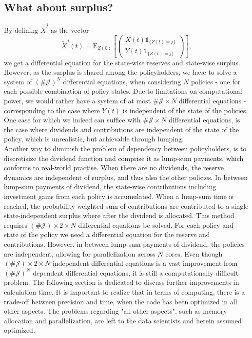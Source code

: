 \documentclass[12pt]{article}
\newcommand{\E}{\text{E}}
\newcommand{\indic}[1]{\mathds{1}_{ \{ #1 \} }}
\begin{document}
\subsection*{What about surplus?}
By defining $\tilde{X}^j$ as the vector
$$
\tilde{X}^j(t)=\E_{Z(0)}
\left[ 
\begin{pmatrix}
X(t)\indic{Z(t)=j}
\\
Y(t)\indic{Z(t)=j}
\end{pmatrix}
\right],
$$
we get a differential equation for the state-wise reserves and state-wise surplus. However, as the surplus is shared among the policyholders, we have to solve a system of $(\#\mathcal{J})^{N}$ differential equations, when considering $N$ policies - one for each possible combination of policy states. Due to limitations on computational power, we would rather have a system of at most $\# \mathcal{J} \times N$ differential equations - corresponding to the case where $Y(t)$ is independent of the state of the policies. One case for which we indeed can suffice with $\# \mathcal{J} \times N$ differential equations, is the case where dividends and contributions are independent of the state of the policy, which is unrealistic, but achievable through lumping.\\
Another way to diminish the problem of dependency between policyholders, is to discretisize the dividend function and comprise it as lump-sum payments, which conforms to real-world practise. When there are no dividends, the reserve dynamics are independent of surplus, and thus also the other policies. In between lump-sum payments of dividend, the state-wise contributions including investment gains from each policy is accumulated. When a lump-sum time is reached, the probability weighted sum of contributions are contributed to a single state-independent surplus where after the dividend is allocated. This method requires $(\# \mathcal{J})\times 2 \times N$ differential equations be solved. For each policy and state of the policy we need a differential equation for the reserve and contributions. However, in between lump-sum payments of dividend, the policies are independent, allowing for parallelization across $N$ cores. Even though $(\# \mathcal{J})\times 2 \times N$ independent differential equations is a vast improvement from $(\# \mathcal{J})^N$ dependent differential equations, it is still a computationally difficult problem. The following section is dedicated to discuss further improvements in calculation time. It is important to realize that in terms of computing, there is a trade-off between precision and time, when the code has been optimized in all other aspects. The problems regarding "all other aspects", such as memory allocation and parallelization, are left to the data scientists and herein assumed optimized.
\\[12pt]
\end{document}
